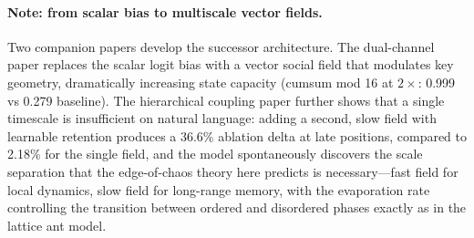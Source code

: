 \documentclass[11pt,a4paper]{article}
\begin{document}
\paragraph{Note: from scalar bias to multiscale vector fields.}
Two companion papers develop the successor architecture.  The
dual-channel paper replaces the scalar logit bias with a vector
social field that modulates key geometry, dramatically increasing
state capacity (cumsum mod 16 at $2\times$: 0.999 vs 0.279 baseline).
The hierarchical coupling paper further shows that a single timescale
is insufficient on natural language: adding a second, slow field
with learnable retention produces a 36.6\% ablation delta at late
positions, compared to 2.18\% for the single field, and the model
spontaneously discovers the scale separation that the edge-of-chaos
theory here predicts is necessary---fast field for local dynamics,
slow field for long-range memory, with the evaporation rate
controlling the transition between ordered and disordered phases
exactly as in the lattice ant model.
\end{document}
